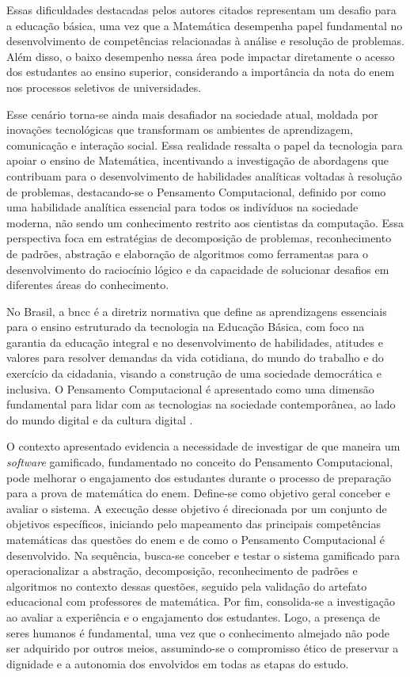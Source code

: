 Essas dificuldades destacadas pelos autores citados representam um desafio para a
educação básica, uma vez que a Matemática desempenha papel fundamental no
desenvolvimento de competências relacionadas à análise e resolução
de problemas. Além disso, o baixo desempenho nessa área pode impactar
diretamente o acesso dos estudantes ao ensino superior, considerando a
importância da nota do \gls{enem} nos processos seletivos de universidades. 

Esse cenário torna-se ainda mais desafiador na sociedade atual, moldada por
inovações tecnológicas que transformam os ambientes de aprendizagem, comunicação
e interação social. Essa realidade ressalta o papel da tecnologia para apoiar o
ensino de Matemática, incentivando a investigação de abordagens que contribuam
para o desenvolvimento de habilidades analíticas voltadas à resolução de
problemas, destacando-se o Pensamento Computacional, definido por \cite{wing2006} como uma habilidade analítica 
essencial para todos os indivíduos na sociedade moderna, não sendo um conhecimento restrito aos cientistas da
computação. Essa perspectiva foca em estratégias de decomposição de problemas,
reconhecimento de padrões, abstração e elaboração de algoritmos como ferramentas
para o desenvolvimento do raciocínio lógico e da capacidade de solucionar
desafios em diferentes áreas do conhecimento.

No Brasil, a \gls{bncc} é a diretriz normativa que define as aprendizagens essenciais para o
ensino estruturado da tecnologia na Educação Básica, com foco na garantia da
educação integral e no desenvolvimento de habilidades, atitudes e valores para
resolver demandas da vida cotidiana, do mundo do trabalho e do exercício da
cidadania, visando a construção de uma sociedade democrática e inclusiva. O Pensamento Computacional é
apresentado como uma dimensão fundamental para lidar com as tecnologias na
sociedade contemporânea, ao lado do mundo digital e da cultura digital 
\cite{brasil2017}.

O contexto apresentado evidencia a necessidade de investigar de que maneira um \textit{software} gamificado, fundamentado no conceito do Pensamento Computacional, pode melhorar
o engajamento dos estudantes durante o processo de preparação para a prova de
matemática do \gls{enem}. Define-se como objetivo geral conceber e avaliar o sistema.
A execução desse objetivo é direcionada por um conjunto de objetivos
específicos, iniciando pelo mapeamento das principais competências matemáticas
das questões do \gls{enem} e de como o Pensamento Computacional é desenvolvido. Na sequência, busca-se
conceber e testar o sistema gamificado para operacionalizar a abstração,
decomposição, reconhecimento de padrões e algoritmos no contexto dessas
questões, seguido pela validação do artefato educacional com professores de
matemática. Por fim, consolida-se a investigação ao avaliar a experiência e o engajamento dos
estudantes. Logo, a presença de seres humanos é fundamental, uma vez que o conhecimento almejado não pode ser adquirido por outros meios, assumindo-se o compromisso ético de preservar a dignidade e a autonomia dos envolvidos em todas as etapas do estudo.
